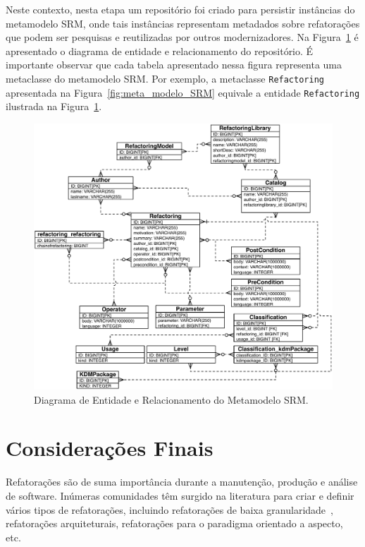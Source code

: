 Neste contexto, nesta etapa um repositório foi criado para persistir instâncias do metamodelo SRM, onde tais instâncias representam metadados sobre refatorações que podem ser pesquisas e reutilizadas por outros modernizadores. Na Figura~\ref{fig:repositorio} é apresentado o diagrama de entidade e relacionamento do repositório. É importante observar que cada tabela apresentado nessa figura representa uma metaclasse do metamodelo SRM. Por exemplo, a metaclasse \texttt{Refactoring} apresentada na Figura~\ref{fig:meta_modelo_SRM} equivale a entidade \texttt{Refactoring} ilustrada na Figura~\ref{fig:repositorio}. 

\begin{figure}[!h]
	\centering
	\caption{Diagrama de Entidade e Relacionamento do Metamodelo SRM.}
	\label{fig:repositorio}
	\includegraphics[scale=0.6]{images/ERD_refactoring}
	\fautor
\end{figure}

\section{Considerações Finais}
\label{sec:consideracoes_finais}

Refatorações são de suma importância durante a manutenção, produção e análise de software. Inúmeras comunidades têm surgido na literatura para criar e definir vários tipos de refatorações, incluindo refatorações de baixa granularidade~\cite{Fowler1999, Demeyer1, Demeyer2}, refatorações arquiteturais, refatorações para o paradigma orientado a aspecto, etc. 

